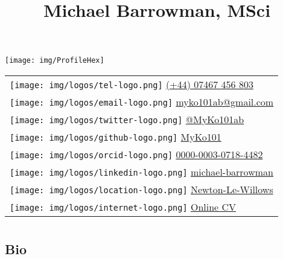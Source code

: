 \documentclass[
]{article}
\title{Michael Barrowman, MSci}
\author{}
\date{\vspace{-2.5em}}
\begin{document}
\maketitle

\newcommand{\bcols}{\begin{multicols}{2}}
\newcommand{\ecols}{\end{multicols} }
\newcommand{\iimg}[1]{\texttt{[image: \#1]}}
\renewcommand{\arraystretch}{1.7}

\setlength{\columnsep}{-2.5cm}
\def\addlinespace{}

\begin{multicols}{2}

\texttt{[image: img/ProfileHex]}

\begin{tabular}{l}
\toprule
\texttt{[image:  img/logos/tel-logo.png]} \href{ tel:+447467456803}{ (+44) 07467 456 803}\\
\texttt{[image:  img/logos/email-logo.png]} \href{ mailto:myko101ab@gmail.com}{ myko101ab@gmail.com}\\
\texttt{[image:  img/logos/twitter-logo.png]} \href{ https://twitter.com/MyKo101ab}{ @MyKo101ab}\\
\texttt{[image:  img/logos/github-logo.png]} \href{ https://github.com/MyKo101}{ MyKo101}\\
\texttt{[image:  img/logos/orcid-logo.png]} \href{ https://orcid.org/0000-0003-0718-4482}{ 0000-0003-0718-4482}\\

\texttt{[image:  img/logos/linkedin-logo.png]} \href{ https://www.linkedin.com/in/michael-barrowman-0403a960/}{ michael-barrowman}\\
\texttt{[image:  img/logos/location-logo.png]} \href{ https://www.google.com/maps/place/Newton-le-Willows/@53.4584287,-2.6730042}{ Newton-Le-Willows}\\
\texttt{[image:  img/logos/internet-logo.png]} \href{ index.html}{ Online CV}\\
\bottomrule
\end{tabular}

\hypertarget{section}{%
\section{}\label{section}}

\hypertarget{bio}{%
\subsection{Bio}\label{bio}}


\end{multicols}
\end{document}
